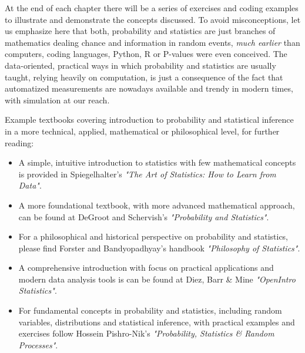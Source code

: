 \medskip

At the end of each chapter there will be a series of exercises and coding examples to illustrate and demonstrate the concepts discussed. To avoid misconceptions, let us emphasize here that both, probability and statistics are just branches of mathematics dealing chance and information in random events, \textit{much earlier} than computers, coding languages, \textsf{Python}, \textsf{R} or P-values were even conceived. The data-oriented, practical ways in which probability and statistics are usually taught, relying heavily on computation, is just a consequence of the fact that automatized measurements are nowadays available and trendy in modern times, with simulation at our reach.

\medskip

Example textbooks covering introduction to probability and statistical inference in a more technical, applied, mathematical or philosophical level, for further reading:

\begin{itemize}
    \item A simple, intuitive introduction to statistics with few mathematical concepts is provided in Spiegelhalter's \textit{"The Art of Statistics: How to Learn from Data"}. 
    \item A more foundational textbook, with more advanced mathematical approach, can be found at DeGroot and Schervish's \textit{"Probability and Statistics"}.   
    \item For a philosophical and historical perspective on probability and statistics, please find Forster and Bandyopadhyay's handbook \textit{"Philosophy of Statistics"}.
    \item A comprehensive introduction with focus on practical applications and modern data analysis tools is can be found at Diez, Barr \& Mine \textit{"OpenIntro Statistics"}.
    \item For fundamental concepts in probability and statistics, including random variables, distributions and statistical inference, with practical examples and exercises follow Hossein Pishro-Nik's \textit{"Probability, Statistics \& Random Processes"}.
\end{itemize}
